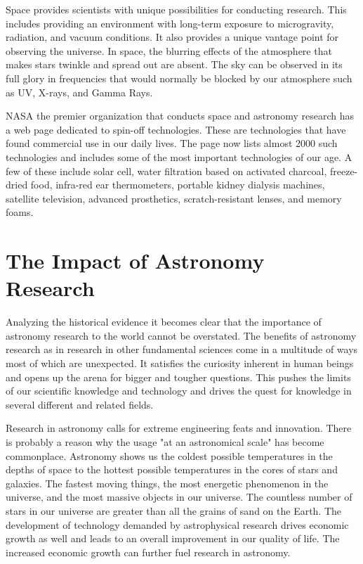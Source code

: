 \documentclass{../template/texnote}
\begin{document}
Space provides scientists with unique possibilities for conducting research. This includes providing an environment with long-term exposure to microgravity, radiation, and vacuum conditions. It also  provides a unique vantage point for observing the universe. In space, the blurring effects of the atmosphere that makes stars twinkle and spread out are absent. The sky can be observed in its full glory in frequencies that would normally be blocked by our atmosphere such as UV, X-rays, and Gamma Rays. 

NASA the premier organization that conducts space and astronomy research has a web page dedicated to spin-off technologies. These are technologies that have found commercial use in our daily lives. The page now lists almost 2000 such technologies and includes some of the most important technologies of our age.  A few of these include solar cell, water filtration based on activated charcoal, freeze-dried food, infra-red ear thermometers, portable kidney dialysis machines, satellite television, advanced prosthetics, scratch-resistant lenses, and memory foams. 




\section{The Impact of Astronomy Research}

Analyzing the historical evidence it becomes clear that the importance of astronomy research to the world cannot be overstated. The benefits of astronomy research as in research in  other fundamental sciences come in a multitude of ways most of which are unexpected. It satisfies the curiosity inherent in human beings and opens up the arena for bigger and tougher questions. This pushes the limits of our scientific knowledge and technology and drives the quest for knowledge in several different and related fields. 

Research in astronomy calls for extreme engineering feats and innovation. There is probably a reason why the usage "at an astronomical scale" has become commonplace. Astronomy shows us the coldest possible temperatures in the depths of space to the hottest possible temperatures in the cores of stars and galaxies. The fastest moving things, the most energetic phenomenon in the universe, and the most massive objects in our universe. The countless number of stars in our universe are greater than all the grains of sand on the Earth. The development of technology demanded by astrophysical research drives economic growth as well and leads to an overall improvement in our quality of life. The increased economic growth can further fuel research in astronomy. 
\end{document}
